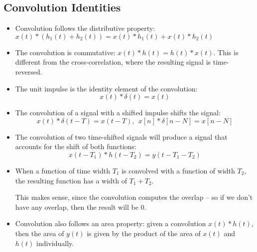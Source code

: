 \subsection{Convolution Identities}
\begin{itemize}
	\item Convolution follows the distributive property: \( x(t) * (h_1(t) + h_2(t)) = x(t) * h_1(t) + x(t)*h_2(t)  \)
	\item The convolution is commutative: \( x(t) * h(t) = h(t) * x(t)\). This is different from the cross-correlation,
		where the resulting signal is time-reversed. 
	\item The unit impulse is the identity element of the convolution:
		\[
		x(t) * \delta(t) = x(t)
		\] 
	\item The convolution of a signal with a shifted impulse shifts the signal:
		\[
			x(t) * \delta(t - T) = x(t - T), \ \ x[n] * \delta[n - N] = x[n - N] 
		\] 
	\item The convolution of two time-shifted signals will produce a signal that accounts for the shift of both 
		functions:
		\[
		x(t - T_1) * h(t - T_2) = y(t - T_1 - T_2)
		\] 
	\item When a function of time width \( T_1 \) is convolved with a function of width \( T_2 \), the resulting
		function has a width of \( T_1 + T_2 \).

		This makes sense, since the convolution computes the overlap -- so if we don't have any overlap, then the 
		result will be 0.
	\item Convolution also follows an area property: given a convolution \( x(t) * h(t) \), then
		the area of \( y(t)  \) is given by the product of the area of \( x(t)  \) and \( h(t) \) individually.
\end{itemize}
